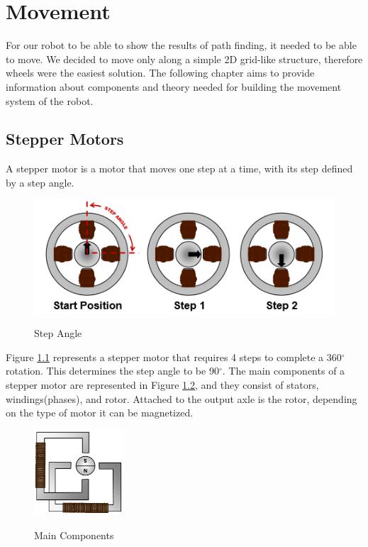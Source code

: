 \chapter{Movement}\label{ch:move}
For our robot to be able to show the results of path finding,
it needed to be able to move. We decided to move only along a simple 2D grid-like structure,
therefore wheels were the easiest solution. The following chapter aims to provide information about
components and theory needed for building the movement system of the robot.



\section{Stepper Motors}\label{sec:motors}
A stepper motor is a motor that moves one step at a time, with its step defined by a step angle.

\begin{figure}[ht]
	\centering
	\includegraphics[width=\textwidth]{figures/move/motor1.png}
	\caption{Step Angle} \cite{figures}
	\label{fig:angle} 
\end{figure}

Figure \ref{fig:angle} represents a stepper motor that requires 4 
steps to complete a 360$^\circ$ 
rotation. This determines the step angle to be 90$^\circ$.
\newpage
The main components of a stepper motor are represented in Figure 
\ref{fig:main_components}, and 
they consist of stators, windings(phases), and rotor.
Attached to the output axle is the rotor, depending on the type of 
motor it can be magnetized.

\begin{figure}[htp]
	\centering
	\includegraphics[width=0.3\textwidth]{figures/move/motor2.png}
	\caption{Main Components}	\cite{figures}
	\label{fig:main_components}
\end{figure}


